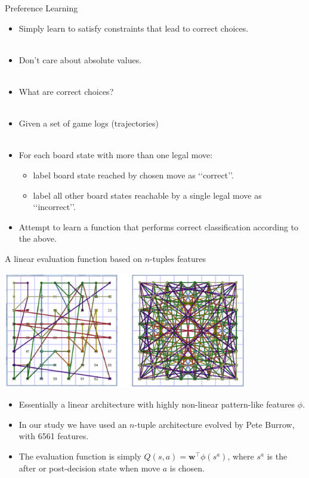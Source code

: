 \documentclass[compress]{beamer}
\renewcommand{\vec}[1]{{\mathbf #1}}
\begin{document}
\begin{frame}{Preference Learning}

\begin{itemize}
\item Simply learn to satisfy constraints that lead to correct choices.\\ \ \pause
\item Don't care about absolute values.\\ \ \pause
\item What are correct choices?\\ \ \pause
\item Given a set of game logs (trajectories)\\ \
\item For each board state with more than one legal move:
\begin{itemize}
\item label board state reached by chosen move as \lq\lq correct\rq\rq.\pause
\item label all other board states reachable by a single legal move as \lq\lq incorrect\rq\rq.\pause
\end{itemize}
\item Attempt to learn a function that performs correct classification according to the above.
\end{itemize}


\end{frame}

\begin{frame}{A linear evaluation function based on $n$-tuples features}

\begin{center}
\includegraphics[width=0.8\textwidth,]{figs/NTupleSnakes.eps}
\end{center}

\begin{itemize}
\item Essentially a linear architecture with highly non-linear pattern-like features $\phi$. \pause
\item In our study we have used an $n$-tuple architecture evolved by Pete Burrow, with 6561 features.\pause
\item The evaluation function is simply $Q(s,a) = \vec{w}^\intercal \phi(s^a)$, where $s^a$ is the after or post-decision state when move $a$ is chosen.
\end{itemize}




\end{frame}
\end{document}
